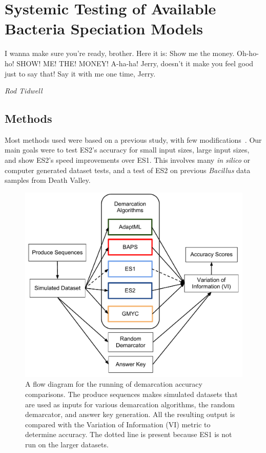 \chapter{Systemic Testing of Available Bacteria Speciation Models}

\begin{shadequote}
I wanna make sure you're ready, brother. Here it is: Show me the money. Oh-ho-ho! SHOW! ME! THE! MONEY! A-ha-ha! Jerry, doesn't it make you feel good just to say that! Say it with me one time, Jerry. \par\emph{Rod Tidwell}
\end{shadequote}


\section{Methods}
Most methods used were based on a previous study, with few modifications~\cite{carlo}.
Our main goals were to test ES2's accuracy for small input sizes, large input sizes, and show ES2's speed improvements over ES1.
This involves many \emph{in silico} or computer generated dataset tests, and a test of ES2 on previous \emph{Bacillus} data samples from Death Valley.

\begin{figure}[h!]
\centering
\includegraphics[scale=0.75]{images/DemarcationComparisonsFlow-CH4}
\caption[Demarcation comparison flow diagram.]{A flow diagram for the running of demarcation accuracy comparisons. The produce sequences makes simulated datasets that are used as inputs for various demarcation algorithms, the random demarcator, and answer key generation. All the resulting output is compared with the Variation of Information (VI) metric to determine accuracy. The dotted line is present because ES1 is not run on the larger datasets.}
\label{fig:ComparisonFlow}
\end{figure}


